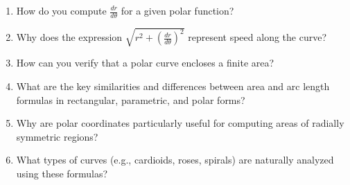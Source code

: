 \begin{enumerate}
  \item How do you compute $\frac{dr}{d\theta}$ for a given polar function?
  \item Why does the expression $\sqrt{r^2 + \left(\frac{dr}{d\theta}\right)^2}$ represent speed along the curve?
  \item How can you verify that a polar curve encloses a finite area?
  \item What are the key similarities and differences between area and arc length formulas in rectangular, parametric, and polar forms?
  \item Why are polar coordinates particularly useful for computing areas of radially symmetric regions?
  \item What types of curves (e.g., cardioids, roses, spirals) are naturally analyzed using these formulas?
\end{enumerate}

